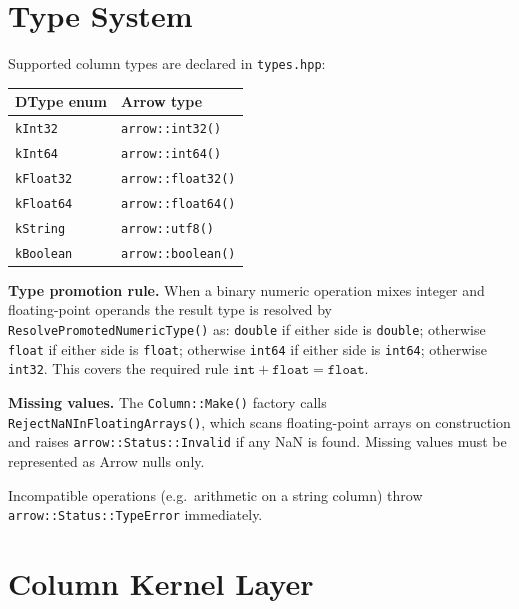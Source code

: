 \documentclass[12pt,a4paper]{article}
\begin{document}
\section{Type System}

Supported column types are declared in \texttt{types.hpp}:

\begin{center}
\begin{tabular}{ll}
\toprule
\textbf{DType enum} & \textbf{Arrow type} \\
\midrule
\texttt{kInt32}   & \texttt{arrow::int32()} \\
\texttt{kInt64}   & \texttt{arrow::int64()} \\
\texttt{kFloat32} & \texttt{arrow::float32()} \\
\texttt{kFloat64} & \texttt{arrow::float64()} \\
\texttt{kString}  & \texttt{arrow::utf8()} \\
\texttt{kBoolean} & \texttt{arrow::boolean()} \\
\bottomrule
\end{tabular}
\end{center}

\textbf{Type promotion rule.}  When a binary numeric operation mixes
integer and floating-point operands the result type is resolved by
\texttt{ResolvePromotedNumericType()} as: \texttt{double} if either side
is \texttt{double}; otherwise \texttt{float} if either side is
\texttt{float}; otherwise \texttt{int64} if either side is \texttt{int64};
otherwise \texttt{int32}.  This covers the required rule $\mathtt{int +
float = float}$.

\textbf{Missing values.}  The \texttt{Column::Make()} factory calls
\texttt{RejectNaNInFloatingArrays()}, which scans floating-point arrays on
construction and raises \texttt{arrow::Status::Invalid} if any NaN is
found.  Missing values must be represented as Arrow nulls only.

Incompatible operations (e.g.\ arithmetic on a string column) throw
\texttt{arrow::Status::TypeError} immediately.

\section{Column Kernel Layer}
\end{document}
